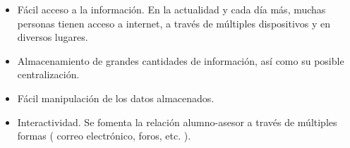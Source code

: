 \begin{itemize}
 \item Fácil acceso a la información. En la actualidad y cada día más, muchas
       personas tienen acceso a internet, a través de múltiples dispositivos y
       en diversos lugares.
 \item Almacenamiento de grandes cantidades de información, así como su posible
       centralización.
 \item Fácil manipulación de los datos almacenados.
 \item Interactividad. Se fomenta la relación alumno-asesor a través de
       múltiples formas ( correo electrónico, foros, etc. ).
\end{itemize}
